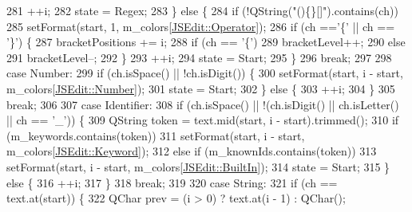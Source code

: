 \begin{DoxyCode}
281                 ++i;
282                 state = Regex;
283             \} \textcolor{keywordflow}{else} \{
284                 \textcolor{keywordflow}{if} (!QString(\textcolor{stringliteral}{"()\{\}[]"}).contains(ch))
285                     setFormat(start, 1, m\_colors[\hyperlink{class_j_s_edit_a5a465193a1344e5be9b04f5ff7883213a7cf7fcdce0c49ff9995b8d8a02a3b127}{JSEdit::Operator}]);
286                 \textcolor{keywordflow}{if} (ch ==\textcolor{charliteral}{'\{'} || ch == \textcolor{charliteral}{'\}'}) \{
287                     bracketPositions += i;
288                     \textcolor{keywordflow}{if} (ch == \textcolor{charliteral}{'\{'})
289                         bracketLevel++;
290                     \textcolor{keywordflow}{else}
291                         bracketLevel--;
292                 \}
293                 ++i;
294                 state = Start;
295             \}
296             \textcolor{keywordflow}{break};
297 
298         \textcolor{keywordflow}{case} Number:
299             \textcolor{keywordflow}{if} (ch.isSpace() || !ch.isDigit()) \{
300                 setFormat(start, i - start, m\_colors[\hyperlink{class_j_s_edit_a5a465193a1344e5be9b04f5ff7883213aeebc6c595d9a8bc74d3b03bd4c8f2d1f}{JSEdit::Number}]);
301                 state = Start;
302             \} \textcolor{keywordflow}{else} \{
303                 ++i;
304             \}
305             \textcolor{keywordflow}{break};
306 
307         \textcolor{keywordflow}{case} Identifier:
308             \textcolor{keywordflow}{if} (ch.isSpace() || !(ch.isDigit() || ch.isLetter() || ch == \textcolor{charliteral}{'\_'})) \{
309                 QString token = text.mid(start, i - start).trimmed();
310                 \textcolor{keywordflow}{if} (m\_keywords.contains(token))
311                     setFormat(start, i - start, m\_colors[\hyperlink{class_j_s_edit_a5a465193a1344e5be9b04f5ff7883213ad70548abdd876f2648764b7924b90251}{JSEdit::Keyword}]);
312                 \textcolor{keywordflow}{else} \textcolor{keywordflow}{if} (m\_knownIds.contains(token))
313                     setFormat(start, i - start, m\_colors[\hyperlink{class_j_s_edit_a5a465193a1344e5be9b04f5ff7883213a8b227288b9e8c72ccb15968f3127f6c2}{JSEdit::BuiltIn}]);
314                 state = Start;
315             \} \textcolor{keywordflow}{else} \{
316                 ++i;
317             \}
318             \textcolor{keywordflow}{break};
319 
320         \textcolor{keywordflow}{case} String:
321             \textcolor{keywordflow}{if} (ch == text.at(start)) \{
322                 QChar prev = (i > 0) ? text.at(i - 1) : QChar();

\end{DoxyCode}
